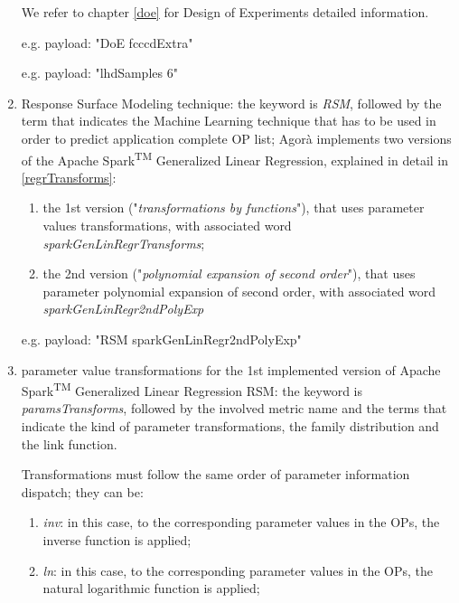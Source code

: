 \begin{enumerate}
    We refer to chapter \ref{doe} for Design of Experiments detailed information.
    
    e.g. payload: "DoE fcccdExtra"
    
    e.g. payload: "lhdSamples 6"
    
    \item Response Surface Modeling technique: the keyword is \textit{RSM}, followed by the term that indicates the Machine Learning technique that has to be used in order to predict application complete OP list; Agorà implements two versions of the Apache Spark\textsuperscript{TM} Generalized Linear Regression, explained in detail in \ref{regrTransforms}:
    
    \begin{enumerate}
    
        \item the 1st version ("\textit{transformations by functions}"), that uses parameter values transformations, with associated word \textit{sparkGenLinRegrTransforms};
        
        \item the 2nd version ("\textit{polynomial expansion of second order}"), that uses parameter polynomial expansion of second order, with associated word \textit{sparkGenLinRegr2ndPolyExp}
    
    \end{enumerate}
    
    e.g. payload: "RSM sparkGenLinRegr2ndPolyExp"
    
    \item parameter value transformations for the 1st implemented version of Apache Spark\textsuperscript{TM} Generalized Linear Regression RSM: the keyword is \textit{paramsTransforms}, followed by the involved metric name and the terms that indicate the kind of parameter transformations, the family distribution and the link function.
    
    Transformations must follow the same order of parameter information dispatch; they can be:
    
    \begin{enumerate}
    
        \item \textit{inv}: in this case, to the corresponding parameter values in the OPs, the inverse function is applied;
        
        \item \textit{ln}: in this case, to the corresponding parameter values in the OPs, the natural logarithmic function is applied;
        

\end{enumerate}
\end{enumerate}

